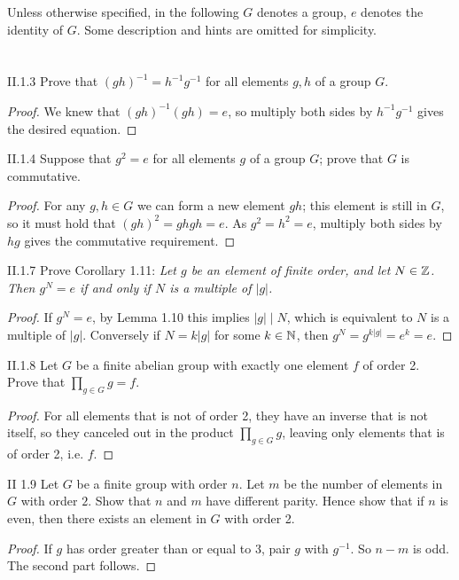 Unless otherwise specified, in the following $G$ denotes a group, $e$ denotes the identity of $G$. Some description and hints are omitted for simplicity.

\section{}

\begin{problem}{II.1.3}
Prove that $(gh)^{-1} = h^{-1}g^{-1}$ for all elements $g,h$ of a group $G$.
\end{problem}
\begin{proof}
We knew that $(gh)^{-1} (gh) = e$, so multiply both sides by $h^{-1}g^{-1}$ gives the desired equation.
\end{proof}

\begin{problem}{II.1.4}
Suppose that $g^2 = e$ for all elements $g$ of a group $G$; prove that $G$ is commutative.
\end{problem}
\begin{proof}
For any $g,h \in G$ we can form a new element $gh$; this element is still in $G$, so it must hold that $(gh)^2 = ghgh = e$. As $g^2 = h^2 = e$, multiply both sides by $hg$ gives the commutative requirement.
\end{proof}

\begin{problem}{II.1.7}
Prove Corollary 1.11: \textit{Let $g$ be an element of finite order, and let $N \in \mathbb{Z}$. Then $g^N = e$ if and only if $N$ is a multiple of $|g|$.}
\end{problem}
\begin{proof}
If $g^N = e$, by Lemma 1.10 this implies $|g|\mid N$, which is equivalent to $N$ is a multiple of $|g|$. Conversely if $N = k|g|$ for some $k \in \mathbb{N}$, then $g^N = g^{k|g|} = e^k = e$.
\end{proof}

\begin{problem}{II.1.8}
Let $G$ be a finite abelian group with exactly one element $f$ of order 2. Prove that $\prod_{g \in G}g = f$.
\end{problem}
\begin{proof}
For all elements that is not of order 2, they have an inverse that is not itself, so they canceled out in the product $\prod_{g \in G}g$, leaving only elements that is of order 2, i.e. $f$.
\end{proof}

\begin{problem}{II 1.9}
Let $G$ be a finite group with order $n$. Let $m$ be the number of elements in $G$ with order $2$. Show that $n$ and $m$ have different parity. Hence show that if $n$ is even, then there exists an element in $G$ with order 2.
\end{problem}
\begin{proof}
If $g$ has order greater than or equal to $3$, pair $g$ with $g^{-1}$. So $n-m$ is odd. The second part follows.
\end{proof}

